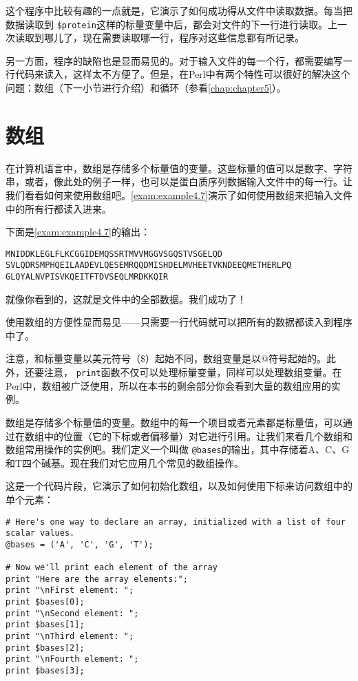 这个程序中比较有趣的一点就是，它演示了如何成功得从文件中读取数据。每当把数据读取到 \verb|$protein|这样的标量变量中后，都会对文件的下一行进行读取。上一次读取到哪儿了，现在需要读取哪一行，程序对这些信息都有所记录。

另一方面，程序的缺陷也是显而易见的。对于输入文件的每一个行，都需要编写一行代码来读入，这样太不方便了。但是，在Perl中有两个特性可以很好的解决这个问题：数组（下一小节进行介绍）和循环（参看\autoref{chap:chapter5}）。

\section{数组}
在计算机语言中，数组是存储多个标量值的变量。这些标量的值可以是数字、字符串，或者，像此处的例子一样，也可以是蛋白质序列数据输入文件中的每一行。让我们看看如何来使用数组吧。\autoref{exam:example4.7}演示了如何使用数组来把输入文件中的所有行都读入进来。



下面是\autoref{exam:example4.7}的输出：

\begin{lstlisting}
MNIDDKLEGLFLKCGGIDEMQSSRTMVVMGGVSGQSTVSGELQD
SVLQDRSMPHQEILAADEVLQESEMRQQDMISHDELMVHEETVKNDEEQMETHERLPQ
GLQYALNVPISVKQEITFTDVSEQLMRDKKQIR
\end{lstlisting}

就像你看到的，这就是文件中的全部数据。我们成功了！

使用数组的方便性显而易见——只需要一行代码就可以把所有的数据都读入到程序中了。

注意，和标量变量以美元符号（\$）起始不同，数组变量是以@符号起始的。此外，还要注意， \verb|print|函数不仅可以处理标量变量，同样可以处理数组变量。在Perl中，数组被广泛使用，所以在本书的剩余部分你会看到大量的数组应用的实例。

数组是存储多个标量值的变量。数组中的每一个项目或者元素都是标量值，可以通过在数组中的位置（它的下标或者偏移量）对它进行引用。让我们来看几个数组和数组常用操作的实例吧。我们定义一个叫做 \verb|@bases|的输出，其中存储着A、C、G和T四个碱基。现在我们对它应用几个常见的数组操作。

这是一个代码片段，它演示了如何初始化数组，以及如何使用下标来访问数组中的单个元素：

\begin{lstlisting}
# Here's one way to declare an array, initialized with a list of four scalar values.
@bases = ('A', 'C', 'G', 'T');

# Now we'll print each element of the array
print "Here are the array elements:";
print "\nFirst element: ";
print $bases[0];
print "\nSecond element: ";
print $bases[1];
print "\nThird element: ";
print $bases[2];
print "\nFourth element: ";
print $bases[3];
\end{lstlisting}

